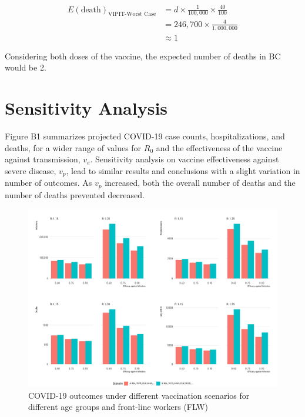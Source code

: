 $$
\begin{aligned}
E(\text{death})_{\text{VIPIT-Worst Case}} & = d \times \frac{1}{100,000} \times \frac{40}{100} \\
& = 246,700 \times \frac{4}{1,000,000} \\
& \approx 1
\end{aligned}
$$

Considering both doses of the vaccine, the expected number of deaths in BC would be 2. 

\section{Sensitivity Analysis}

Figure B1 summarizes projected COVID-19 case counts, hospitalizations, and deaths, for a wider range of values for $R_0$ and the effectiveness of the vaccine against transmission, $v_e$. Sensitivity analysis on vaccine effectiveness against severe disease, $v_p$, lead to similar results and conclusions with a slight variation in number of outcomes. As $v_p$ increased, both the overall number of deaths and the number of deaths prevented decreased.

\begin{figure}[htb]
\begin{center}
\includegraphics[width=6in]{"../figures/fig-barplots.pdf"}
\caption{COVID-19 outcomes under different vaccination scenarios for different age groups and front-line workers (FLW)}
\end{center}
\end{figure}


